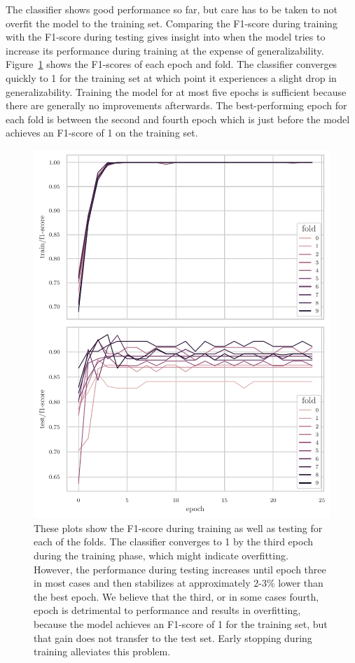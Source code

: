\documentclass[draft,final]{vutinfth} %
\begin{document}
The classifier shows good performance so far, but care has to be taken
to not overfit the model to the training set. Comparing the F1-score
during training with the F1-score during testing gives insight into
when the model tries to increase its performance during training at
the expense of generalizability. Figure~\ref{fig:classifier-hyp-folds}
shows the F1-scores of each epoch and fold. The classifier converges
quickly to 1 for the training set at which point it experiences a
slight drop in generalizability. Training the model for at most five
epochs is sufficient because there are generally no improvements
afterwards. The best-performing epoch for each fold is between the
second and fourth epoch which is just before the model achieves an
F1-score of 1 on the training set.

\begin{figure}
  \centering
  \includegraphics[width=.9\textwidth]{graphics/classifier-hyp-folds-f1.pdf}
  \caption[F1-score of stratified $10$-fold cross validation.]{These
    plots show the F1-score during training as well as testing for
    each of the folds. The classifier converges to 1 by the third
    epoch during the training phase, which might indicate
    overfitting. However, the performance during testing increases
    until epoch three in most cases and then stabilizes at
    approximately 2-3\% lower than the best epoch. We believe that the
    third, or in some cases fourth, epoch is detrimental to
    performance and results in overfitting, because the model achieves
    an F1-score of 1 for the training set, but that gain does not
    transfer to the test set. Early stopping during training
    alleviates this problem.}
  \label{fig:classifier-hyp-folds}
\end{figure}
\end{document}
